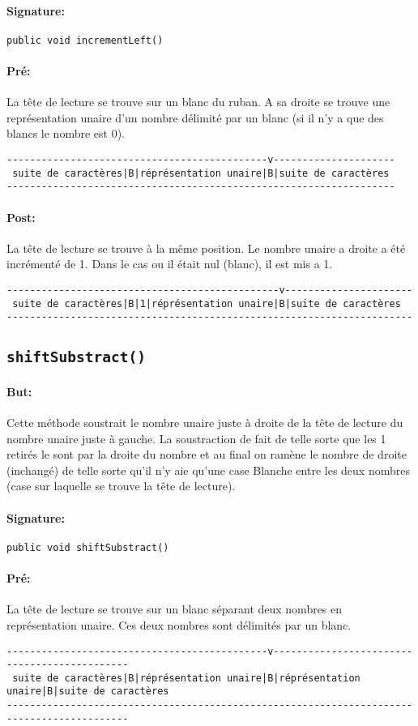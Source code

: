 \documentclass[a4paper,11pt]{article}
\begin{document}
\paragraph{Signature:} \texttt{public void incrementLeft()}
\paragraph{Pré:} 
La tête de lecture se trouve sur un blanc du ruban. A sa droite se trouve une représentation unaire d'un nombre délimité par un blanc (si il n'y a que des blancs le nombre est 0).
\begin{verbatim}
---------------------------------------------v---------------------
 suite de caractères|B|réprésentation unaire|B|suite de caractères
-------------------------------------------------------------------
\end{verbatim}
\paragraph{Post:}
La tête de lecture se trouve à la même position. Le nombre unaire a droite a été incrémenté de 1. Dans le cas ou il était nul (blanc), il est mis a 1.
\begin{verbatim}
-----------------------------------------------v----------------------
 suite de caractères|B|1|réprésentation unaire|B|suite de caractères
----------------------------------------------------------------------
\end{verbatim}
\subsection{\texttt{shiftSubstract()}}
\paragraph{But:} Cette méthode soustrait le nombre unaire juste à droite de la tête de lecture du nombre unaire juste à gauche. La soustraction de fait de telle sorte que les 1 retirés le sont par la droite du nombre et au final on ramène le nombre de droite (inchangé) de telle sorte qu'il n'y aie qu'une case Blanche entre les deux nombres (case sur laquelle se trouve la tête de lecture).
\paragraph{Signature:} \texttt{public void shiftSubstract()}
\paragraph{Pré:}
La tête de lecture se trouve sur un blanc séparant deux nombres en représentation unaire. Ces deux nombres sont délimités par un blanc.
\begin{small}
\begin{verbatim}
---------------------------------------------v---------------------------------------------
 suite de caractères|B|réprésentation unaire|B|réprésentation unaire|B|suite de caractères
-------------------------------------------------------------------------------------------
\end{verbatim}
\end{small}
\end{document}
